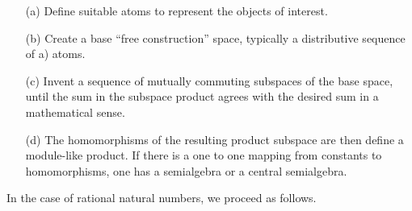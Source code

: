 \documentclass[11pt]{article}
\begin{document}
 \begin{itemize}
 \item[(a)]{Define suitable atoms to represent the objects of interest.}
 \item[(b)]{Create a base ``free construction'' space, typically a distributive sequence of a) atoms.} 
 \item[(c)]{Invent a sequence of mutually commuting subspaces of the base space, until the sum in the subspace product agrees with the desired sum in 
 a mathematical sense.}
 \item[(d)]{The homomorphisms of the resulting product subspace are then define a module-like product.  If there is a one to one mapping 
 from constants to homomorphisms, one has a semialgebra or a central semialgebra.}
 \end{itemize}
 In the case of rational natural numbers, we proceed as follows.
\end{document}
